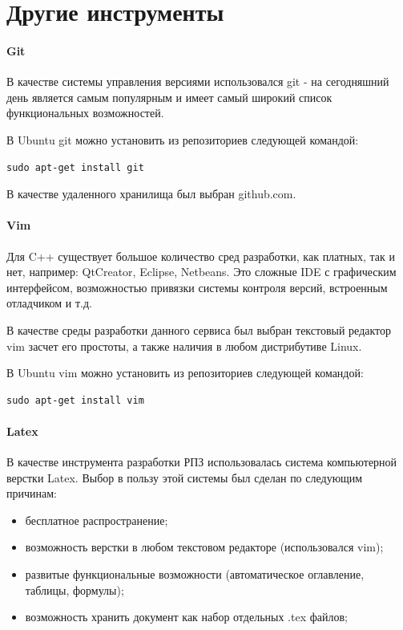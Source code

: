 \section{Другие инструменты}
\paragraph{Git}

В качестве системы управления версиями использовался git - на сегодняшний день является самым популярным и имеет самый широкий список функциональных возможностей.

В Ubuntu git можно установить из репозиториев следующей командой:
\begin{lstlisting}
sudo apt-get install git
\end{lstlisting}

В качестве удаленного хранилища был выбран github.com.

\paragraph{Vim}

Для C++ существует большое количество сред разработки, как платных, так и нет, например: QtCreator, Eclipse, Netbeans. Это сложные IDE с графическим интерфейсом, возможностью привязки системы контроля версий, встроенным отладчиком и т.д.

В качестве среды разработки данного сервиса был выбран текстовый редактор vim засчет его простоты, а также наличия в любом дистрибутиве Linux.

В Ubuntu vim можно установить из репозиториев следующей командой:
\begin{lstlisting}
sudo apt-get install vim
\end{lstlisting}

\paragraph{Latex}

В качестве инструмента разработки РПЗ использовалась система компьютерной верстки Latex. Выбор в пользу этой системы был сделан по следующим причинам:
\begin{itemize}
\item бесплатное распространение;
\item возможность верстки в любом текстовом редакторе (использовался vim);
\item развитые функциональные возможности (автоматическое оглавление, таблицы, формулы);
\item возможность хранить документ как набор отдельных .tex файлов;
\end{itemize}

